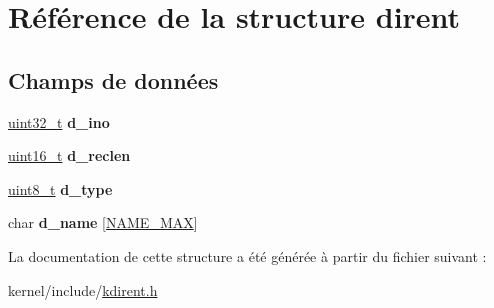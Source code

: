 \hypertarget{structdirent}{\section{\-Référence de la structure dirent}
\label{structdirent}
}
\subsection*{\-Champs de données}
\begin{DoxyCompactItemize}
\item 
\hypertarget{structdirent_a0ed2e5ea3c71500f628914bf3966e4ba}{\hyperlink{types_8h_a33594304e786b158f3fb30289278f5af}{uint32\-\_\-t} {\bfseries d\-\_\-ino}}\label{structdirent_a0ed2e5ea3c71500f628914bf3966e4ba}

\item 
\hypertarget{structdirent_a7cc67dd4ba5a8bed7f107f249957688d}{\hyperlink{types_8h_adf4d876453337156dde61095e1f20223}{uint16\-\_\-t} {\bfseries d\-\_\-reclen}}\label{structdirent_a7cc67dd4ba5a8bed7f107f249957688d}

\item 
\hypertarget{structdirent_a948760e3b7f607213a19f85e7af15a32}{\hyperlink{types_8h_aba7bc1797add20fe3efdf37ced1182c5}{uint8\-\_\-t} {\bfseries d\-\_\-type}}\label{structdirent_a948760e3b7f607213a19f85e7af15a32}

\item 
\hypertarget{structdirent_a7b4cbd53dc600257b2746225c8a8f3be}{char {\bfseries d\-\_\-name} \mbox{[}\hyperlink{kdirent_8h_ac64541bdd81c961304b9babef1402640}{\-N\-A\-M\-E\-\_\-\-M\-A\-X}\mbox{]}}\label{structdirent_a7b4cbd53dc600257b2746225c8a8f3be}

\end{DoxyCompactItemize}


\-La documentation de cette structure a été générée à partir du fichier suivant \-:\begin{DoxyCompactItemize}
\item 
kernel/include/\hyperlink{kdirent_8h}{kdirent.\-h}\end{DoxyCompactItemize}
